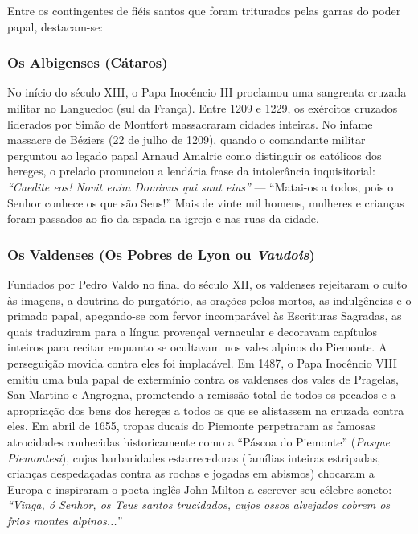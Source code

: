 \documentclass[11pt,a4paper,openany]{book}
\begin{document}
Entre os contingentes de fiéis santos que foram triturados pelas garras do poder papal, destacam-se:


\subsubsection*{Os Albigenses (Cátaros)}
No início do século XIII, o Papa Inocêncio III proclamou uma sangrenta cruzada militar no Languedoc (sul da França). Entre 1209 e 1229, os exércitos cruzados liderados por Simão de Montfort massacraram cidades inteiras. No infame massacre de Béziers (22 de julho de 1209), quando o comandante militar perguntou ao legado papal Arnaud Amalric como distinguir os católicos dos hereges, o prelado pronunciou a lendária frase da intolerância inquisitorial: \textit{``Caedite eos! Novit enim Dominus qui sunt eius''} — ``Matai-os a todos, pois o Senhor conhece os que são Seus!'' Mais de vinte mil homens, mulheres e crianças foram passados ao fio da espada na igreja e nas ruas da cidade.


\subsubsection*{Os Valdenses (Os Pobres de Lyon ou \textit{Vaudois})}
Fundados por Pedro Valdo no final do século XII, os valdenses rejeitaram o culto às imagens, a doutrina do purgatório, as orações pelos mortos, as indulgências e o primado papal, apegando-se com fervor incomparável às Escrituras Sagradas, as quais traduziram para a língua provençal vernacular e decoravam capítulos inteiros para recitar enquanto se ocultavam nos vales alpinos do Piemonte. A perseguição movida contra eles foi implacável. Em 1487, o Papa Inocêncio VIII emitiu uma bula papal de extermínio contra os valdenses dos vales de Pragelas, San Martino e Angrogna, prometendo a remissão total de todos os pecados e a apropriação dos bens dos hereges a todos os que se alistassem na cruzada contra eles. Em abril de 1655, tropas ducais do Piemonte perpetraram as famosas atrocidades conhecidas historicamente como a ``Páscoa do Piemonte'' (\textit{Pasque Piemontesi}), cujas barbaridades estarrecedoras (famílias inteiras estripadas, crianças despedaçadas contra as rochas e jogadas em abismos) chocaram a Europa e inspiraram o poeta inglês John Milton a escrever seu célebre soneto: \textit{``Vinga, ó Senhor, os Teus santos trucidados, cujos ossos alvejados cobrem os frios montes alpinos...''}
\end{document}
